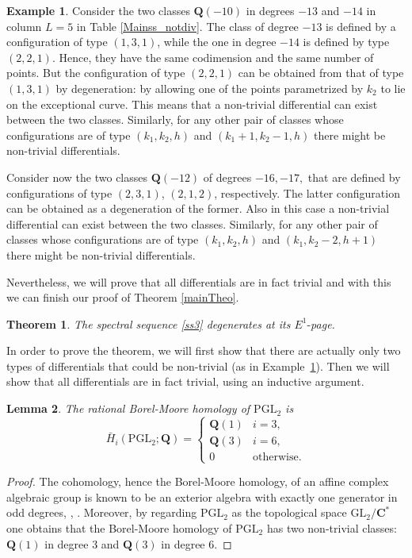\documentclass[10pt,a4paper,twoside]{amsart}
\theoremstyle{plain}
\newtheorem{theo}{Theorem}[section]
\newtheorem{lem}[theo]{Lemma}
\theoremstyle{definition}
\newtheorem{exe}{Example}
\theoremstyle{remark}
\begin{document}
\begin{exe} \label{ex-nontrivial}
Consider the two classes $\mathbf{Q}(-10)$ in degrees $-13$ and $-14$ in column $L=5$ in Table \ref{Mainss_notdiv}. 
The class of degree $-13$ is defined by a configuration of type $(1,3,1)$, while the one in degree $-14$ is defined by type $(2,2,1)$. Hence, they have the same codimension and the same number of points. But the configuration of type $(2,2,1)$ can be obtained from that of type $(1,3,1)$ by degeneration: by allowing one of the points parametrized by $k_2$ to lie on the exceptional curve. This means that a non-trivial differential can exist between the two classes. Similarly, for any other pair of classes whose configurations are of type $(k_1,k_2,h)$ and $(k_1+1,k_2-1,h)$ there might be non-trivial differentials. 

Consider now the two classes $\mathbf{Q}(-12)$ of degrees $-16,-17,$ that are defined by configurations of type $(2,3,1)$, $(2,1,2)$, respectively. The latter configuration can be obtained as a degeneration of the former.
Also in this case a non-trivial differential can exist between the two classes. Similarly, for any other pair of classes whose configurations are of type $(k_1,k_2,h)$ and $(k_1,k_2-2,h+1)$ there might be non-trivial differentials.

Nevertheless, we will prove that all differentials are in fact trivial and with this we can finish our proof of Theorem \ref{mainTheo}.
\end{exe}

\begin{theo}\label{theo5.7}The spectral sequence \eqref{ss3} 
degenerates at its $E^1\mbox{-}$page. 
\end{theo}

In order to prove the theorem, we will first show that there are actually only two types of differentials that could be non-trivial (as in Example~\ref{ex-nontrivial}). Then we will show that all differentials are in fact trivial, using an inductive argument.

\begin{lem} \label{lem-pgl2}
    The rational Borel-Moore homology of $\mathrm{PGL}_2$ is 
    \begin{equation*}
    \bar{H}_i(\mathrm{PGL}_2;\mathbf Q)=\begin{cases}
    \mathbf{Q}(1)&i=3,\\
    \mathbf{Q}(3)&i=6,\\
    0&\text{otherwise.}
    \end{cases}
    \end{equation*}
\end{lem}
\begin{proof}
The cohomology, hence the Borel-Moore homology, of an affine complex algebraic group is known to be an exterior algebra with exactly one generator in odd degrees, \cite{Bor53}, \cite{Hop41}. Moreover, by regarding $\mathrm{PGL}_2$ as the topological space $\mathrm{GL}_2/\mathbf{C}^*$ one obtains that the Borel-Moore homology of $\mathrm{PGL}_2$ has two non-trivial classes: $\mathbf{Q}(1)$ in degree $3$ and $\mathbf{Q}(3)$ in degree $6$.
\end{proof}
\end{document}
